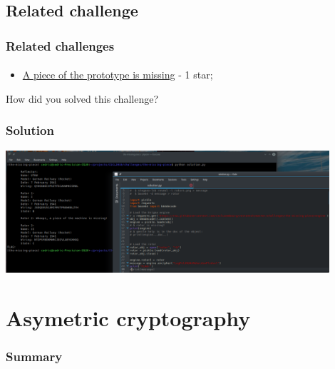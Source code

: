 \documentclass[]{beamer}
\begin{document}
\subsection{Related challenge}
\begin{frame}
\frametitle{Related challenges}
\framesubtitle{}
\begin{itemize}
    \item \href{https://github.com/cscluxembourg/vestatech/tree/master/challenges/the-missing-piece}{A piece of the prototype is missing} - 1 star;
\end{itemize}
\bigskip
How did you solved this challenge?
\end{frame}



\begin{frame}
\frametitle{Solution}
\begin{center}
    \includegraphics[width=12.0cm]{./images/Enigma_solution1.png}
\end{center}
\end{frame}






%
%
\section{Asymetric cryptography}
\begin{frame}
\frametitle{Summary}
\begin{columns}[t]
\begin{column}{5cm}
\tableofcontents[sections={1-3}, currentsection, hideothersubsections]
\end{column}
\begin{column}{5cm}
\tableofcontents[sections={4-5}, currentsection, hideothersubsections]
\end{column}
\end{columns}
\end{frame}
\end{document}
